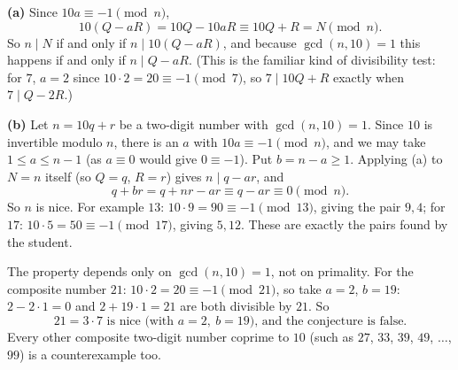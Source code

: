\textbf{(a)} Since $10a\equiv-1\pmod n$,
\[10(Q-aR)=10Q-10aR\equiv10Q+R=N\pmod n.\]
So $n\mid N$ if and only if $n\mid10(Q-aR)$, and because $\gcd(n,10)=1$ this happens if and only if $n\mid Q-aR$. (This is the familiar kind of divisibility test: for $7$, $a=2$ since $10\cdot2=20\equiv-1\pmod7$, so $7\mid10Q+R$ exactly when $7\mid Q-2R$.)

\textbf{(b)} Let $n=10q+r$ be a two-digit number with $\gcd(n,10)=1$. Since $10$ is invertible modulo $n$, there is an $a$ with $10a\equiv-1\pmod n$, and we may take $1\le a\le n-1$ (as $a\equiv0$ would give $0\equiv-1$). Put $b=n-a\ge1$. Applying (a) to $N=n$ itself (so $Q=q$, $R=r$) gives $n\mid q-ar$, and
\[q+br=q+nr-ar\equiv q-ar\equiv0\pmod n.\]
So $n$ is nice. For example $13$: $10\cdot9=90\equiv-1\pmod{13}$, giving the pair $9,4$; for $17$: $10\cdot5=50\equiv-1\pmod{17}$, giving $5,12$. These are exactly the pairs found by the student.

The property depends only on $\gcd(n,10)=1$, not on primality. For the composite number $21$: $10\cdot2=20\equiv-1\pmod{21}$, so take $a=2$, $b=19$: $2-2\cdot1=0$ and $2+19\cdot1=21$ are both divisible by $21$. So
\[\boxed{21=3\cdot7\text{ is nice (with }a=2,\ b=19\text{), and the conjecture is false.}}\]
Every other composite two-digit number coprime to $10$ (such as $27$, $33$, $39$, $49$, $\dots$, $99$) is a counterexample too.
